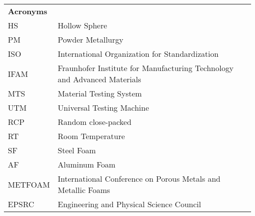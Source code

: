 \documentclass[review]{elsarticle}
\begin{document}
\begin{table}[htbp]
	\begin{tabular}{ll}
		\textbf{Acronyms} \\
		HS    & Hollow Sphere \\
		PM    & Powder Metallurgy \\
		ISO   & International Organization for Standardization \\
		IFAM  & Fraunhofer Institute for Manufacturing Technology and Advanced Materials \\
		MTS   & Material Testing System \\
		UTM   & Universal Testing Machine \\
		RCP   & Random close-packed \\
		RT    & Room Temperature \\
		SF    & Steel Foam \\
		AF    & Aluminum Foam \\
		METFOAM & International Conference on Porous Metals and Metallic Foams \\
		EPSRC & Engineering and Physical Science Council \\
	\end{tabular}%
\end{table}%

\renewcommand{\nomname}{List of Symbols}
\end{document}
